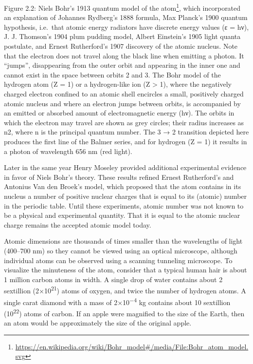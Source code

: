 \documentclass[
]{article}
\let\rmarkdownfootnote\footnote%
\def\footnote{\protect\rmarkdownfootnote}
\renewcommand{\href}[2]{#2\footnote{\url{#1}}}
\theoremstyle{definition}
\theoremstyle{definition}
\theoremstyle{definition}
\theoremstyle{remark}
\begin{document}
Figure 2.2: Niels Bohr's 1913
\href{https://en.wikipedia.org/wiki/Bohr_model\#/media/File:Bohr_atom_model.svg}{quantum
model of the atom}, which incorporated an explanation of Johannes
Rydberg's 1888 formula, Max Planck's 1900 quantum hypothesis, i.e.~that
atomic energy radiators have discrete energy values (ε = hν), J. J.
Thomson's 1904 plum pudding model, Albert Einstein's 1905 light quanta
postulate, and Ernest Rutherford's 1907 discovery of the atomic nucleus.
Note that the electron does not travel along the black line when
emitting a photon. It ``jumps'', disappearing from the outer orbit and
appearing in the inner one and cannot exist in the space between orbits
2 and 3. The Bohr model of the hydrogen atom (Z = 1) or a hydrogen-like
ion (Z \textgreater{} 1), where the negatively charged electron confined
to an atomic shell encircles a small, positively charged atomic nucleus
and where an electron jumps between orbits, is accompanied by an emitted
or absorbed amount of electromagnetic energy (hν). The orbits in which
the electron may travel are shown as grey circles; their radius
increases as n2, where n is the principal quantum number. The 3 → 2
transition depicted here produces the first line of the Balmer series,
and for hydrogen (Z = 1) it results in a photon of wavelength 656 nm
(red light).

Later in the same year Henry Moseley provided additional experimental
evidence in favor of Niels Bohr's theory. These results refined Ernest
Rutherford's and Antonius Van den Broek's model, which proposed that the
atom contains in its nucleus a number of positive nuclear charges that
is equal to its (atomic) number in the periodic table. Until these
experiments, atomic number was not known to be a physical and
experimental quantity. That it is equal to the atomic nuclear charge
remains the accepted atomic model today.

Atomic dimensions are thousands of times smaller than the wavelengths of
light (400--700 nm) so they cannot be viewed using an optical
microscope, although individual atoms can be observed using a scanning
tunneling microscope. To visualize the minuteness of the atom, consider
that a typical human hair is about 1 million carbon atoms in width. A
single drop of water contains about 2 sextillion
(2×10\textsuperscript{21}) atoms of oxygen, and twice the number of
hydrogen atoms. A single carat diamond with a mass of
2×10\textsuperscript{−4} kg contains about 10 sextillion
(10\textsuperscript{22}) atoms of carbon. If an apple were magnified to
the size of the Earth, then an atom would be approximately the size of
the original apple.
\end{document}
